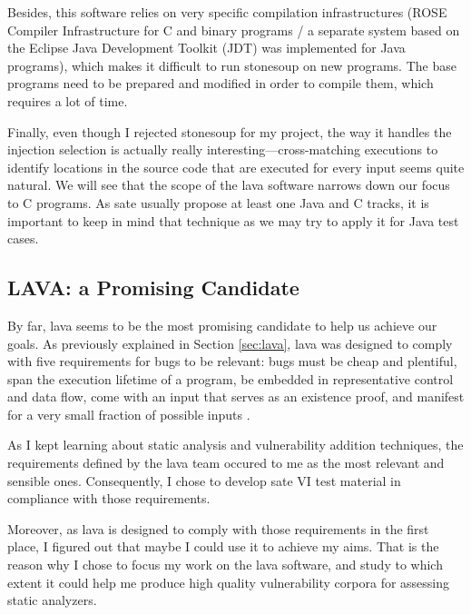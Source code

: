 \vspace{0.3cm}

Besides, this software relies on very specific compilation infrastructures (ROSE Compiler Infrastructure for C and binary programs \cite{llnl2016rose} / a separate system based on the Eclipse Java Development Toolkit (JDT) was implemented for Java programs), which makes it difficult to run \gls{stonesoup} on new programs. The base programs need to be prepared and modified in order to compile them, which requires a lot of time.

\vspace{0.3cm}

Finally, even though I rejected \gls{stonesoup} for my project, the way it handles the injection selection is actually really interesting---cross-matching executions to identify locations in the source code that are executed for every input seems quite natural. We will see that the scope of the \gls{lava} software narrows down our focus to C programs. As \gls{sate} usually propose at least one Java and C tracks, it is important to keep in mind that technique as we may try to apply it for Java test cases.

\subsection{LAVA: a Promising Candidate}

\vspace{0.4cm}

By far, \gls{lava} seems to be the most promising candidate to help us achieve our goals. As previously explained in Section \ref{sec:lava}, \gls{lava} was designed to comply with five requirements for bugs to be relevant: bugs must be cheap and plentiful, span the execution lifetime of a program, be embedded in representative control and data flow, come with an input that serves as an existence proof, and manifest for a very small fraction of possible inputs \cite{dolan2016lava}.

\vspace{0.3cm}

As I kept learning about static analysis and vulnerability addition techniques, the requirements defined by the \gls{lava} team occured to me as the most relevant and sensible ones. Consequently, I chose to develop \gls{sate} VI test material in compliance with those requirements.

Moreover, as \gls{lava} is designed to comply with those requirements in the first place, I figured out that maybe I could use it to achieve my aims. That is the reason why I chose to focus my work on the \gls{lava} software, and study to which extent it could help me produce high quality vulnerability corpora for assessing static analyzers.

